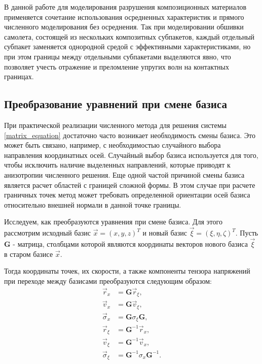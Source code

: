 В данной работе для моделирования разрушения композиционных материалов применяется сочетание использования осредненных характеристик и прямого численного моделирования без осреднения. Так при моделировании обшивки самолета, состоящей из нескольких композитных субпакетов, каждый отдельный субпакет заменяется однородной средой с эффективными характеристиками, но при этом границы между отдельными субпакетами выделяются явно, что позволяет учесть отражение и преломление упругих волн на контактных границах.


\clearpage
\newpage

\subsection{Преобразование уравнений при смене базиса}

При практической реализации численного метода для решения системы \ref{matrix_equation} достаточно часто возникает необходимость смены базиса. Это может быть связано, например, с необходимостью случайного выбора направления координатных осей. Случайный выбор базиса используется для того, чтобы исключить наличие выделенных направлений, которые приводят к анизотропии численного решения. Еще одной частой причиной смены базиса является расчет областей с границей сложной формы. В этом случае при расчете граничных точек метод может требовать определенной ориентации осей базиса относительно внешней нормали в данной точке границы.

Исследуем, как преобразуются уравнения при смене базиса. Для этого рассмотрим исходный базис $\vec x = (x, y, z)^T$ и новый базис $\vec \xi = (\xi, \eta, \zeta)^T$. Пусть $\mathbf G$ - матрица, столбцами которой являются координаты векторов нового базиса $\vec \xi$ в старом базисе $\vec x$.

Тогда координаты точек, их скорости, а также компоненты тензора напряжений при переходе между базисами преобразуются следующим образом:
\begin{align}
\label{basis_change}
\vec r_x &= \mathbf G \vec r_{\xi},
\nonumber\\
\vec v_x &= \mathbf G \vec v_{\xi},
\nonumber\\
\vec \sigma_x &= \mathbf G \sigma_{\xi} \mathbf G,
\nonumber\\
\vec r_{\xi} &= {\mathbf G}^{-1} \vec r_x,
\nonumber\\
\vec v_{\xi} &= {\mathbf G}^{-1} \vec v_x,
\nonumber\\
\vec \sigma_{\xi} &= {\mathbf G}^{-1} \sigma_x {\mathbf G}^{-1}.
\end{align}


